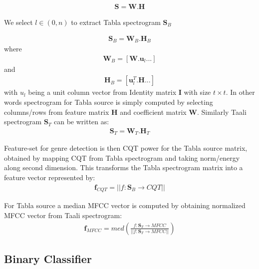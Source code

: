 \documentclass{article}
\begin{document}
\begin{align}\label{eq:eq1}
\boldsymbol{S} = \boldsymbol{W}.\boldsymbol{H}
\end{align}

We select $l \in (0,n)$ to extract Tabla spectrogram $\boldsymbol{S}_{B}$ 

\begin{align}\label{eq:eq2}
\boldsymbol{S}_{B} = \boldsymbol{W}_{B}.\boldsymbol{H}_{B}
\end{align}
where
\begin{align}\label{eq:eq3}
\boldsymbol{W}_{B} = [\boldsymbol{W}.\boldsymbol{u}_{l} ...]
\end{align}
and 
\begin{align}\label{eq:eq4}
\boldsymbol{H}_{B} = [\boldsymbol{u}_{l}^T.\boldsymbol{H} ...]
\end{align}
with $u_{l}$ being a unit column vector from Identity matrix $\boldsymbol{I}$ with size ${t\times t}$. In other words spectrogram for Tabla source is simply computed
by selecting columns/rows from feature matrix $\boldsymbol{H}$ and coefficient matrix $\boldsymbol{W}$. Similarly Taali spectrogram $\boldsymbol{S}_{T}$ can be written as:
\begin{align}\label{eq:eq5}
\boldsymbol{S}_{T} = \boldsymbol{W}_{T}.\boldsymbol{H}_{T}
\end{align}

Feature-set for genre detection is then CQT power for the Tabla source matrix, obtained by mapping CQT from Tabla spectrogram and taking norm/energy along second dimension. This transforms the Tabla spectrogram matrix into a feature vector represented by:
\begin{align}\label{eq:eq6}
\boldsymbol{f}_{CQT} = \lvert \lvert f\colon \boldsymbol{S}_{B}\to CQT \rvert \rvert
\end{align}

For Tabla source a median MFCC vector is computed by obtaining normalized MFCC vector from Taali spectrogram:
\begin{align}\label{eq:eq7}
\boldsymbol{f}_{MFCC} = med(\frac{f\colon \boldsymbol{S}_{T}\to MFCC}{\lvert \lvert {f\colon \boldsymbol{S}_{T}\to MFCC} \rvert \rvert})
\end{align}

\subsection{Binary Classifier}
\end{document}
